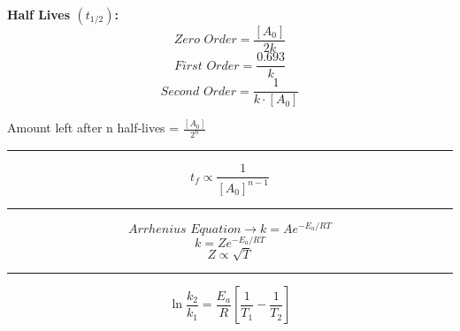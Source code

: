 \documentclass[fleqn, a4paper, 8pt, twocolumn]{article}
\begin{document}
\textbf{Half Lives $(t_{1/2})$:}
\[Zero\,\,Order = \frac{[A_0]}{2k}\]
\[First\,\,Order = \frac{0.693}{k}\]
\[Second\,\,Order = \frac{1}{k\cdot [A_0]}\]

Amount left after n half-lives = $\frac{[A_0]}{2^n}$\\
\noindent\rule[0.5ex]{\linewidth}{0.5pt}
\[t_f \propto \frac{1}{[A_0]^{n-1}}\]
\noindent\rule[0.5ex]{\linewidth}{0.5pt}
\[Arrhenius\,\,Equation \to k = Ae^{-E_a/RT}\]
\[k = Ze^{-E_a/RT}\]
\[Z \propto \sqrt{T}\]
\noindent\rule[0.5ex]{\linewidth}{0.5pt}
\[\ln\frac{k_2}{k_1} = \frac{E_a}{R}\left[\frac{1}{T_1} - \frac{1}{T_2}\right]\]
\end{document}
